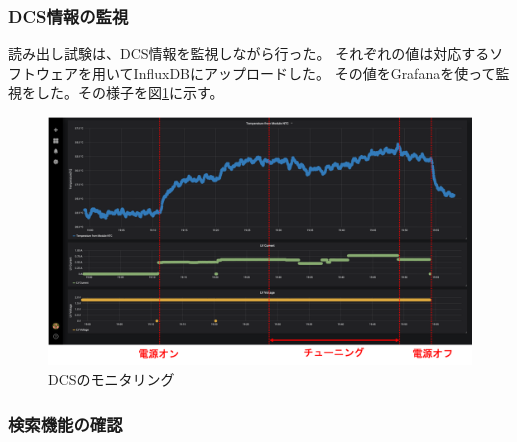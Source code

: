 \subsubsection{DCS情報の監視}
読み出し試験は、DCS情報を監視しながら行った。
それぞれの値は対応するソフトウェアを用いてInfluxDBにアップロードした。
その値をGrafanaを使って監視をした。その様子を図\ref{demo_monitor_dcs}に示す。

\begin{figure}[bpt]\centering
\includegraphics[width=12cm]{demo_monitor_dcs}
\caption[DCSのモニタリング]{DCSのモニタリング}
\label{demo_monitor_dcs}
\end{figure}

\newpage
\subsubsection{検索機能の確認}

